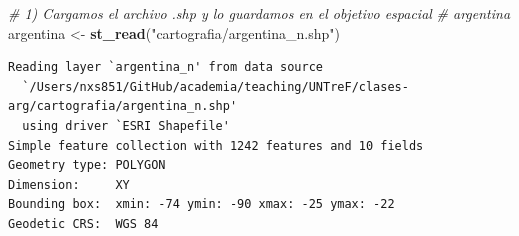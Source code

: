\documentclass[
]{article}
\newenvironment{Shaded}{\begin{snugshade}}{\end{snugshade}}
\newcommand{\CommentTok}[1]{\textcolor[rgb]{0.56,0.35,0.01}{\textit{#1}}}
\newcommand{\FunctionTok}[1]{\textcolor[rgb]{0.13,0.29,0.53}{\textbf{#1}}}
\newcommand{\NormalTok}[1]{#1}
\newcommand{\OtherTok}[1]{\textcolor[rgb]{0.56,0.35,0.01}{#1}}
\newcommand{\StringTok}[1]{\textcolor[rgb]{0.31,0.60,0.02}{#1}}
\begin{document}
\begin{Shaded}
\begin{Highlighting}[]
\CommentTok{\# 1) Cargamos el archivo .shp y lo guardamos en el objetivo espacial}
\CommentTok{\# \textquotesingle{}argentina\textquotesingle{}}
\NormalTok{argentina }\OtherTok{\textless{}{-}} \FunctionTok{st\_read}\NormalTok{(}\StringTok{"cartografia/argentina\_n.shp"}\NormalTok{)}
\end{Highlighting}
\end{Shaded}

\begin{verbatim}
Reading layer `argentina_n' from data source 
  `/Users/nxs851/GitHub/academia/teaching/UNTreF/clases-arg/cartografia/argentina_n.shp' 
  using driver `ESRI Shapefile'
Simple feature collection with 1242 features and 10 fields
Geometry type: POLYGON
Dimension:     XY
Bounding box:  xmin: -74 ymin: -90 xmax: -25 ymax: -22
Geodetic CRS:  WGS 84
\end{verbatim}
\end{document}
